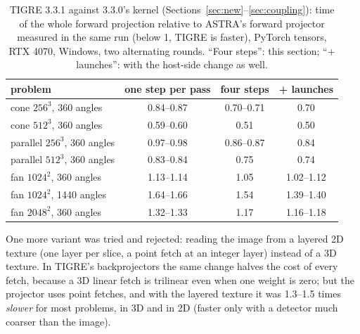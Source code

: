 \documentclass[11pt,a4paper]{article}
\theoremstyle{remark}
\begin{document}
\begin{table}[h]
\centering
\caption{\label{tab:v331}TIGRE 3.3.1 against 3.3.0's kernel (Sections~\ref{sec:new}--\ref{sec:coupling}):
time of the whole forward projection relative to ASTRA's forward projector measured in the same run
(below 1, TIGRE is faster), PyTorch tensors, RTX 4070, Windows, two alternating rounds. ``Four steps'': this
section; ``+ launches'': with the host-side change as well.}
\small
\begin{tabular}{lccc}
\toprule
problem & one step per pass & four steps & + launches\\
\midrule
cone $256^3$, 360 angles     & 0.84--0.87 & 0.70--0.71 & 0.70\\
cone $512^3$, 360 angles     & 0.59--0.60 & 0.51 & 0.50\\
parallel $256^3$, 360 angles & 0.97--0.98 & 0.86--0.87 & 0.84\\
parallel $512^3$, 360 angles & 0.83--0.84 & 0.75 & 0.74\\
fan $1024^2$, 360 angles     & 1.13--1.14 & 1.05 & 1.02--1.12\\
fan $1024^2$, 1440 angles    & 1.64--1.66 & 1.54 & 1.39--1.40\\
fan $2048^2$, 360 angles     & 1.32--1.33 & 1.17 & 1.16--1.18\\
\bottomrule
\end{tabular}
\end{table}

One more variant was tried and rejected: reading the image from a layered 2D texture (one layer per slice,
a point fetch at an integer layer) instead of a 3D texture. In TIGRE's backprojectors the same change halves
the cost of every fetch, because a 3D linear fetch is trilinear even when one weight is zero; but the projector
uses point fetches, and with the layered texture it was 1.3--1.5 times \emph{slower} for most problems, in 3D
and in 2D (faster only with a detector much coarser than the image).
\end{document}
